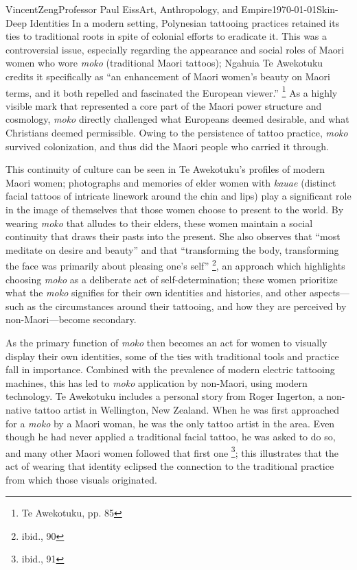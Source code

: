 \documentclass[12pt]{article}
\begin{document}
\begin{mla}{Vincent}{Zeng}{Professor Paul Eiss}{Art, Anthropology, and
  Empire}{\today}{Skin-Deep Identities}
In a modern setting, Polynesian tattooing practices retained its ties to
traditional roots in spite of colonial efforts to eradicate it. This was
a controversial issue, especially regarding the appearance and social roles of
Maori women who wore \textit{moko} (traditional Maori tattoos); Ngahuia Te
Awekotuku credits it specifically as ``an enhancement of Maori women's beauty on
Maori terms, and it both repelled and fascinated the European viewer.''
\footnote{Te Awekotuku, pp. 85} As a highly visible mark that represented a core
part of the Maori power structure and cosmology, \textit{moko} directly
challenged what Europeans deemed desirable, and what Christians deemed
permissible. Owing to the persistence of tattoo practice, \textit{moko} survived
colonization, and thus did the Maori people who carried it through.

This continuity of culture can be seen in Te Awekotuku's profiles of modern
Maori women; photographs and memories of elder women with \textit{kauae}
(distinct facial tattoos of intricate linework around the chin and lips) play a
significant role in the image of themselves that those women choose to present
to the world. By wearing \textit{moko} that alludes to their elders, these women
maintain a social continuity that draws their pasts into the present. She also
observes that ``most meditate on desire and beauty'' and that ``transforming the
body, transforming the face was primarily about pleasing one's self''
\footnote{ibid., 90}, an approach which highlights choosing
\textit{moko} as a deliberate act of self-determination; these women prioritize
what the \textit{moko} signifies for their own identities and histories, and
other aspects---such as the circumstances around their tattooing, and how they
are perceived by non-Maori---become secondary.

As the primary function of \textit{moko} then  becomes an act for women to visually
display their own identities, some of the ties with traditional tools and
practice fall in importance. Combined with the prevalence of modern
electric tattooing machines, this has led to \textit{moko} application by
non-Maori, using modern technology. Te Awekotuku includes a personal story from
Roger Ingerton, a non-native tattoo artist in Wellington, New Zealand. When he was
first approached for a \textit{moko} by a Maori woman, he was the only tattoo
artist in the area. Even though he had never applied a traditional facial
tattoo, he was asked to do so, and many other Maori women followed that first
one \footnote{ibid., 91}; this illustrates that the act of wearing that
identity eclipsed the connection to the traditional practice from which those
visuals originated.


\end{mla}
\end{document}
